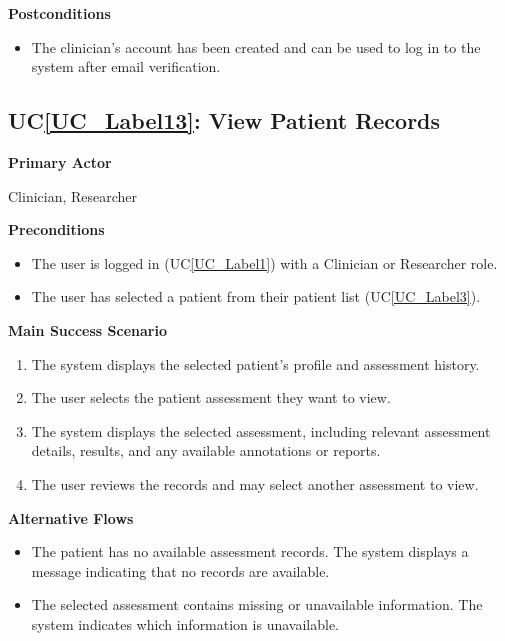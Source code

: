 \documentclass[12pt]{article}
\newcounter{ucnum} %
\newcommand{\ucref}[1]{UC\ref{#1}}
\begin{document}
\textbf{Postconditions}

\begin{itemize}
\item The clinician's account has been created and can be used to log in to the system after email verification.
\end{itemize}

 \label{UC_Label13}

\subsection{\ucref{UC_Label13}: View Patient Records}

\textbf{Primary Actor}

Clinician, Researcher

\textbf{Preconditions}

\begin{itemize}
\item The user is logged in (\ucref{UC_Label1}) with a Clinician or Researcher role.
\item The user has selected a patient from their patient list (\ucref{UC_Label3}).
\end{itemize}

\textbf{Main Success Scenario}

\begin{enumerate}
\item The system displays the selected patient's profile and assessment history.
\item The user selects the patient assessment they want to view.
\item The system displays the selected assessment, including relevant assessment details, results, and any available annotations or reports.
\item The user reviews the records and may select another assessment to view.
\end{enumerate}

\textbf{Alternative Flows}

\begin{itemize}
\item[1a.] The patient has no available assessment records. The system displays a message indicating that no records are available.
\item[3a.] The selected assessment contains missing or unavailable information. The system indicates which information is unavailable.
\end{itemize}
\end{document}
